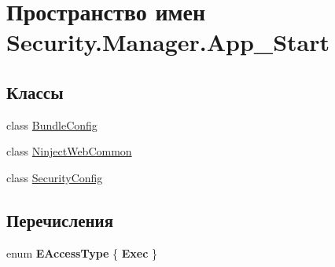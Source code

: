 \hypertarget{namespace_security_1_1_manager_1_1_app___start}{}\section{Пространство имен Security.\+Manager.\+App\+\_\+\+Start}
\label{namespace_security_1_1_manager_1_1_app___start}
\subsection*{Классы}
\begin{DoxyCompactItemize}
\item 
class \hyperlink{class_security_1_1_manager_1_1_app___start_1_1_bundle_config}{Bundle\+Config}
\item 
class \hyperlink{class_security_1_1_manager_1_1_app___start_1_1_ninject_web_common}{Ninject\+Web\+Common}
\item 
class \hyperlink{class_security_1_1_manager_1_1_app___start_1_1_security_config}{Security\+Config}
\end{DoxyCompactItemize}
\subsection*{Перечисления}
\begin{DoxyCompactItemize}
\item 
\mbox{\label{namespace_security_1_1_manager_1_1_app___start_a52ab4d4a3e64078b0b486aea5e1dbc6b}} 
enum {\bfseries E\+Access\+Type} \{ {\bfseries Exec}
 \}
\end{DoxyCompactItemize}
